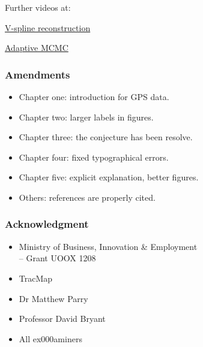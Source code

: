 \documentclass{beamer}
\begin{document}
\begin{frame}

Further videos at:

\href{https://www.youtube.com/watch?v=lQOSt8HrYRU&t=61s}{V-spline reconstruction} 

\href{https://www.youtube.com/watch?v=CF6Sut3G6eI&t=67s}{Adaptive MCMC} 

\end{frame}




\begin{frame}
\frametitle{Amendments}
\begin{itemize}
	\item Chapter one: introduction for GPS data.
	\item Chapter two: larger labels in figures.
	\item Chapter three: the conjecture has been resolve.
	\item Chapter four: fixed typographical errors.
	\item Chapter five: explicit explanation, better figures.
	\item Others: references are properly cited.
\end{itemize}


\end{frame}



\begin{frame}
\frametitle{Acknowledgment}
\begin{itemize}
\item Ministry of Business, Innovation \& Employment\\
 \hskip 0.5cm -- Grant UOOX 1208\\
\item TracMap\\
\item Dr Matthew Parry\\
\item Professor David Bryant \\
\item All ex000aminers 
\end{itemize}
\end{frame}
\end{document}
